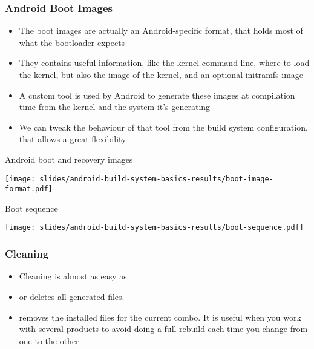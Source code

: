\begin{frame}
  \frametitle{Android Boot Images}
  \begin{itemize}
  \item The boot images are actually an Android-specific format, that
    holds most of what the bootloader expects
  \item They contains useful information, like the kernel command
    line, where to load the kernel, but also the image of the kernel,
    and an optional initramfs image
  \item A custom  tool is used by Android to generate
    these images at compilation time from the kernel and the system
    it's generating
  \item We can tweak the behaviour of that tool from the build system
    configuration, that allows a great flexibility
  \end{itemize}
\end{frame}

\begin{frame}{Android boot and recovery images}
  \begin{center}
  \texttt{[image: slides/android-build-system-basics-results/boot-image-format.pdf]}
  \end{center}
\end{frame}

\begin{frame}{Boot sequence}
  \begin{center}
  \texttt{[image: slides/android-build-system-basics-results/boot-sequence.pdf]}
  \end{center}
\end{frame}

\begin{frame}
  \frametitle{Cleaning}
  \begin{itemize}
  \item Cleaning is almost as easy as 
  \item {} or  deletes all generated
    files.
  \item {} removes the installed files for the
    current combo. It is useful when you work with several products to
    avoid doing a full rebuild each time you change from one to the
    other
  \end{itemize}
\end{frame}
